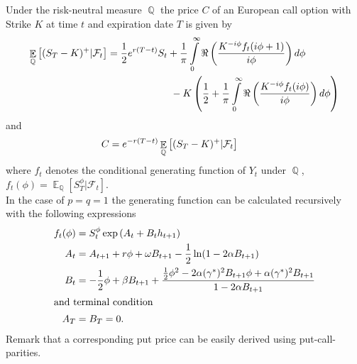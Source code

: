 \documentclass{article}
\DeclareMathOperator{\E}{\mathbb{E}}
\DeclareMathOperator{\Q}{\mathbb{Q}}
\begin{document}
Under the risk-neutral measure $\Q$ the price $C$ of an European call option with Strike $K$ at time $t$ and expiration date $T$ is given by
\begin{align*}
    \E_{\Q}\left[(S_T-K)^+|\mathcal{F}_t\right] &=\frac{1}{2}e^{r(T-t)}S_t+\frac{1}{\pi}\int\limits_0^{\infty}\Re\left(\frac{K^{-i\phi}f_t(i\phi+1)}{i\phi}\right)d\phi\\
    &\hspace{2.25cm}-K\left(\frac{1}{2}+\frac{1}{\pi}\int\limits_0^{\infty}\Re\left(\frac{K^{-i\phi}f_t(i\phi)}{i\phi}\right)d\phi \right)
\end{align*}
and
\begin{align}
       C&= e^{-r(T-t)}\E_{\Q}\left[ (S_T-K)^+|\mathcal{F}_t\right]\hspace{0.7cm}\label{eq:pricing}
\end{align}
where $f_t$ denotes the conditional generating function of $Y_t$ under $\Q$, $f_t(\phi) = \E_{\Q}\left[S_T^{\phi}|\mathcal{F}_t\right]$. \\
In the case of $p=q=1$ the generating function can be calculated recursively with the following expressions
\begin{align*}
    f_t(\phi)&=S_t^\phi \exp\left(A_t+B_t h_{t+1}\right)\\
    A_t&=A_{t+1}+r\phi +\omega B_{t+1}-\frac{1}{2}\ln(1-2\alpha B_{t+1})\\
    B_t&= -\frac{1}{2}\phi +\beta B_{t+1}+\frac{\frac{1}{2}\phi^2-2\alpha(\gamma^*)^2B_{t+1}\phi+\alpha(\gamma^*)^2 B_{t+1}}{1-2\alpha B_{t+1}}\\
    \intertext{and terminal condition}
    A_T&=B_T=0.
\end{align*}
Remark that a corresponding put price can be easily derived using put-call-parities. 
\end{document}
